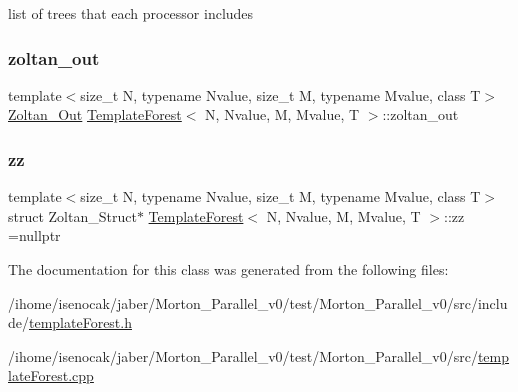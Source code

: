 list of trees that each processor includes \mbox{\label{classTemplateForest_a81d2200ebbc1e3a2ae557e6b6db3c442}} 
\subsubsection{\texorpdfstring{zoltan\+\_\+out}{zoltan\_out}}
{\footnotesize\ttfamily template$<$size\+\_\+t N, typename Nvalue, size\+\_\+t M, typename Mvalue, class T$>$ \\
\mbox{\hyperlink{structZoltan__Out}{Zoltan\+\_\+\+Out}} \mbox{\hyperlink{classTemplateForest}{Template\+Forest}}$<$ N, Nvalue, M, Mvalue, T $>$\+::zoltan\+\_\+out\hspace{0.3cm}{\ttfamily [private]}}

\mbox{\label{classTemplateForest_ad2dcf7d131f6fa9c68e3dba5229b85d6}} 
\subsubsection{\texorpdfstring{zz}{zz}}
{\footnotesize\ttfamily template$<$size\+\_\+t N, typename Nvalue, size\+\_\+t M, typename Mvalue, class T$>$ \\
struct Zoltan\+\_\+\+Struct$\ast$ \mbox{\hyperlink{classTemplateForest}{Template\+Forest}}$<$ N, Nvalue, M, Mvalue, T $>$\+::zz =nullptr\hspace{0.3cm}{\ttfamily [private]}}



The documentation for this class was generated from the following files\+:\begin{DoxyCompactItemize}
\item 
/ihome/isenocak/jaber/\+Morton\+\_\+\+Parallel\+\_\+v0/test/\+Morton\+\_\+\+Parallel\+\_\+v0/src/include/\mbox{\hyperlink{templateForest_8h}{template\+Forest.\+h}}\item 
/ihome/isenocak/jaber/\+Morton\+\_\+\+Parallel\+\_\+v0/test/\+Morton\+\_\+\+Parallel\+\_\+v0/src/\mbox{\hyperlink{templateForest_8cpp}{template\+Forest.\+cpp}}\end{DoxyCompactItemize}
